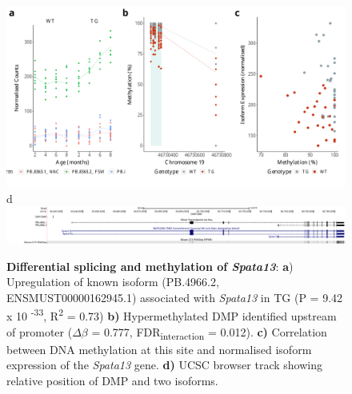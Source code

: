 \begin{figure}[ht]
	\includegraphics[page=2,scale = 0.4]{Figures/WholeDifferentialAnalysis_DMPDMR.pdf}
	\\
	\hspace*{0.2cm}\vspace{0.5cm}\large d
	\\
	\includegraphics[page=1,trim={1.5cm 0 0 0},scale = 0.9]{Figures/SPATA13_DMP.pdf}
	\captionsetup{width=0.95\textwidth}
	\caption[Differential splicing and methylation of \textit{Spata13}]%
	{\textbf{Differential splicing and methylation of \textit{Spata13}}: \textbf{a}) Upregulation of known isoform (PB.4966.2, ENSMUST00000162945.1) associated with \textit{Spata13} in TG (P = 9.42 x 10 \textsuperscript{-33}, R\textsuperscript{2} = 0.73) \textbf{b)} Hypermethylated DMP identified upstream of promoter ($\Delta$$\beta$ = 0.777, FDR\textsubscript{interaction} = 0.012). \textbf{c)} Correlation between DNA methylation at this site and normalised isoform expression of the \textit{Spata13} gene. \textbf{d)} UCSC browser track showing relative position of DMP and two isoforms. }    
	\label{fig:IntMeth_Spata13}
\end{figure}


